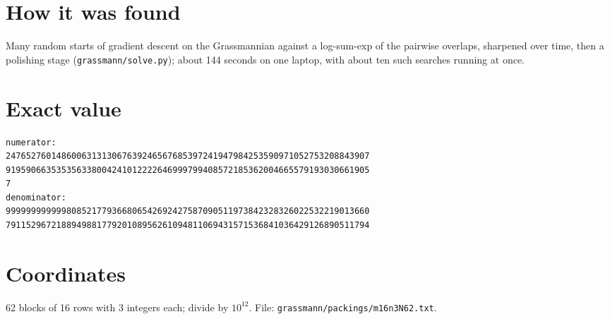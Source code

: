 \documentclass[11pt,a4paper]{article}
\begin{document}
\section{How it was found}
Many random starts of gradient descent on the Grassmannian against a log-sum-exp of the pairwise overlaps, sharpened over time, then a polishing stage (\texttt{grassmann/solve.py}); about 144 seconds on one laptop, with about ten such searches running at once.


\appendix
\section{Exact value}
{\small
\begin{verbatim}
numerator:
247652760148600631313067639246567685397241947984253590971052753208843907
919590663535356338004241012222646999799408572185362004665579193030661905
7
denominator:
999999999999808521779366806542692427587090511973842328326022532219013660
791152967218894988177920108956261094811069431571536841036429126890511794
\end{verbatim}}

\section{Coordinates}
62 blocks of 16 rows with 3 integers each; divide by $10^{12}$. File: \texttt{grassmann/packings/m16n3N62.txt}.
{\tiny
\begin{multicols}{3}
\end{multicols}}
\end{document}
